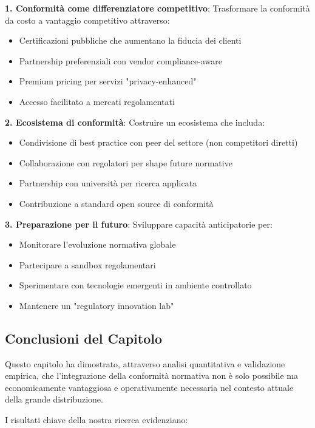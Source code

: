 \textbf{1. Conformità come differenziatore competitivo}:
Trasformare la conformità da costo a vantaggio competitivo attraverso:
\begin{itemize}
    \item Certificazioni pubbliche che aumentano la fiducia dei clienti
    \item Partnership preferenziali con vendor compliance-aware
    \item Premium pricing per servizi "privacy-enhanced"
    \item Accesso facilitato a mercati regolamentati
\end{itemize}

\textbf{2. Ecosistema di conformità}:
Costruire un ecosistema che includa:
\begin{itemize}
    \item Condivisione di best practice con peer del settore (non competitori diretti)
    \item Collaborazione con regolatori per shape future normative
    \item Partnership con università per ricerca applicata
    \item Contribuzione a standard open source di conformità
\end{itemize}

\textbf{3. Preparazione per il futuro}:
Sviluppare capacità anticipatorie per:
\begin{itemize}
    \item Monitorare l'evoluzione normativa globale
    \item Partecipare a sandbox regolamentari
    \item Sperimentare con tecnologie emergenti in ambiente controllato
    \item Mantenere un "regulatory innovation lab"
\end{itemize}

\subsection{Conclusioni del Capitolo}
\label{subsec:4.9.4_conclusioni_capitolo}

Questo capitolo ha dimostrato, attraverso analisi quantitativa e validazione empirica, che l'integrazione della conformità normativa non è solo possibile ma economicamente vantaggiosa e operativamente necessaria nel contesto attuale della grande distribuzione.

I risultati chiave della nostra ricerca evidenziano:


